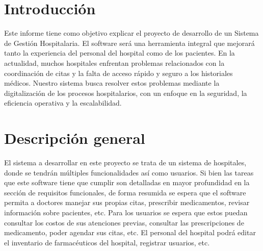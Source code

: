 \documentclass[10pt]{article}
\newlength{\x}
\begin{document}
\newpage
\section{Introducción}
Este informe tiene como objetivo explicar el proyecto de desarrollo de un Sistema de Gestión Hospitalaria. El software será una herramienta integral que mejorará tanto la experiencia del personal del hospital como de los pacientes. En la actualidad, muchos hospitales enfrentan problemas relacionados con la coordinación de citas y la falta de acceso rápido y seguro a los historiales médicos. Nuestro sistema busca resolver estos problemas mediante la digitalización de los procesos hospitalarios, con un enfoque en la seguridad, la eficiencia operativa y la escalabilidad. 


\section{Descripción general}
El sistema a desarrollar en este proyecto se trata de un sistema de hospitales, donde se tendrán múltiples funcionalidades así como usuarios. 
Si bien las tareas que este software tiene que cumplir son detalladas en mayor profundidad en la sección de requisitos funcionales, de forma resumida se espera que el software permita a doctores manejar sus propias citas, prescribir medicamentos, revisar información sobre pacientes, etc. Para los usuarios se espera que estos puedan consultar los costos de sus atenciones previas, consultar las prescripciones de medicamento, poder agendar sus citas, etc. El personal del hospital podrá editar el inventario de farmacéuticos del hospital, registrar usuarios, etc.
\end{document}
